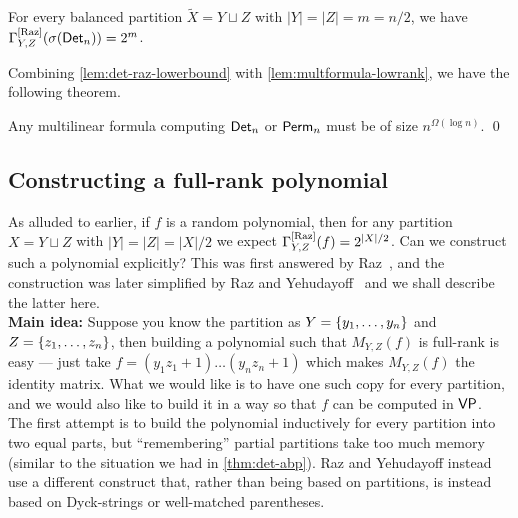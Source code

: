 \begin{lemma}\label{lem:det-raz-lowerbound}
  For every balanced partition $\tilde{X} = Y \sqcup Z$ with $|Y| = |Z| = m = n/2$, we have $\Gamma^{\mathrm{[Raz]}}_{Y,Z}(\sigma(\operatorname{\mathsf{Det}}_n)) = 2^m$. 
\end{lemma}


Combining \autoref{lem:det-raz-lowerbound} with \autoref{lem:multformula-lowrank}, we have the following theorem. 

\begin{theorem} Any multilinear formula computing $\operatorname{\mathsf{Det}}_n$ or $\operatorname{\mathsf{Perm}}_n$ must be of size $n^{\Omega(\log n)}$. \qed
\end{theorem}

\subsection{Constructing a full-rank polynomial}\label{sec:fullrankpoly}

As alluded to earlier,  if $f$ is a random polynomial, then for any partition $X = Y \sqcup Z$ with $|Y| = |Z| = |X|/2$ we expect $\Gamma^{\mathrm{[Raz]}}_{Y,Z}(f) = 2^{|X|/2}$. 
Can we construct such a polynomial explicitly? 
This was first answered by Raz~\cite{Raz06}, and the construction was later simplified by Raz and Yehudayoff~\cite{ry08} and we shall describe the latter here. \\

{\bf Main idea:} Suppose you know the partition as $Y = \left\{y_1,\dots, y_n\right\}$ and $Z = \left\{z_1,\dots, z_n\right\}$, then building a polynomial such that $M_{Y,Z}(f)$ is full-rank is easy --- just take $f = (y_1z_1 + 1)\dots (y_n z_n + 1)$ which makes $M_{Y,Z}(f)$ the identity matrix. 
What we would like is to have one such copy for every partition, and we would also like to build it in a way so that $f$ can be computed in $\mathsf{VP}$. \\

The first attempt is to build the polynomial inductively for every partition into two equal parts, but ``remembering'' partial partitions take too much memory (similar to the situation we had in \autoref{thm:det-abp}). 
Raz and Yehudayoff instead use a different construct that, rather than being based on partitions, is instead based on Dyck-strings or well-matched parentheses. 

